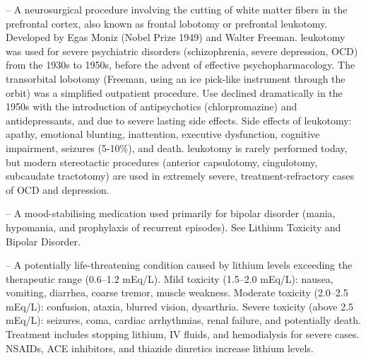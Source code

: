 -- A neurosurgical procedure involving the cutting of white matter fibers in the prefrontal cortex, also known as frontal lobotomy or prefrontal leukotomy. Developed by Egas Moniz (Nobel Prize 1949) and Walter Freeman. leukotomy was used for severe psychiatric disorders (schizophrenia, severe depression, OCD) from the 1930s to 1950s, before the advent of effective psychopharmacology. The transorbital lobotomy (Freeman, using an ice pick-like instrument through the orbit) was a simplified outpatient procedure. Use declined dramatically in the 1950s with the introduction of antipsychotics (chlorpromazine) and antidepressants, and due to severe lasting side effects. Side effects of leukotomy: apathy, emotional blunting, inattention, executive dysfunction, cognitive impairment, seizures (5-10\%), and death. leukotomy is rarely performed today, but modern stereotactic procedures (anterior capsulotomy, cingulotomy, subcaudate tractotomy) are used in extremely severe, treatment-refractory cases of OCD and depression.

-- A mood-stabilising medication used primarily for bipolar disorder (mania, hypomania, and prophylaxis of recurrent episodes). See Lithium Toxicity and Bipolar Disorder.

-- A potentially life-threatening condition caused by lithium levels exceeding the therapeutic range (0.6--1.2 mEq/L). Mild toxicity (1.5--2.0 mEq/L): nausea, vomiting, diarrhea, coarse tremor, muscle weakness. Moderate toxicity (2.0--2.5 mEq/L): confusion, ataxia, blurred vision, dysarthria. Severe toxicity (above 2.5 mEq/L): seizures, coma, cardiac arrhythmias, renal failure, and potentially death. Treatment includes stopping lithium, IV fluids, and hemodialysis for severe cases. NSAIDs, ACE inhibitors, and thiazide diuretics increase lithium levels.

